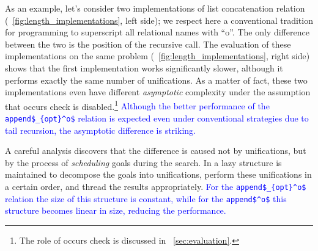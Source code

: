 As an example, let's consider two implementations of list concatenation relation (\figureword~\ref{fig:length_implementations}, left side); we respect here a conventional tradition
for \mK programming to superscript all relational names with ``o''. The only difference between the two is
the position of the recursive call.
The evaluation of these implementations on the same problem (\figureword~\ref{fig:length_implementations}, right side) shows that the first implementation works significantly
slower,
although it performs exactly the same number of unifications. As a matter of fact, these two implementations even have different \emph{asymptotic} complexity under the assumption
that occurs check is disabled.\footnote{The role of occurs check is discussed in
\sectionword~\ref{sec:evaluation}.} \textcolor{blue}{Although the better performance of the \lstinline|append$_{opt}^o$| relation is expected even under conventional strategies due to tail recursion, the asymptotic difference is striking.}

A careful analysis discovers that the difference is caused not by unifications, but by the process of \emph{scheduling} goals during the search. In \mK a
lazy structure is maintained to decompose the goals into unifications, perform these unifications in a certain order, and thread the results appropriately. \textcolor{blue}{For the \lstinline|append$_{opt}^o$| relation the size of this structure is constant, while for the \lstinline|append$^o$|
this structure becomes linear in size, reducing the performance.}


